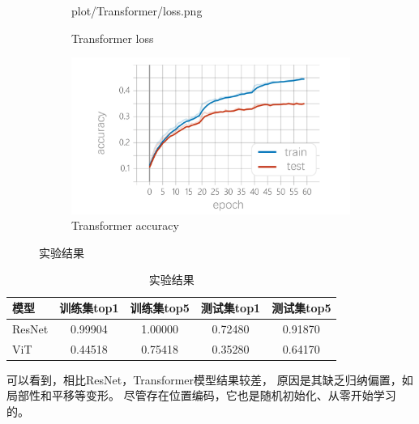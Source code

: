 \documentclass[12pt]{article}
\begin{document}
\begin{figure}[h]
\begin{subfigure}{0.5\textwidth}
		{plot/Transformer/loss.png}
		\caption{Transformer loss}
	\end{subfigure}
	\begin{subfigure}{0.5\textwidth}
		\includegraphics[width=\linewidth]
		{plot/Transformer/top1.png}
		\caption{Transformer accuracy}
	\end{subfigure}
	\caption{实验结果}
	\label{fig:Classify}
\end{figure}

\begin{table}[h]
	\centering
	\begin{tabular}{|l|c|c|c|c|} 
		\hline
		模型 
		& 训练集top1 & 训练集top5 
		& 测试集top1 & 测试集top5\\
		\hline
		ResNet & 0.99904 & 1.00000 & 0.72480 & 0.91870 \\
		ViT & 0.44518 & 0.75418 & 0.35280 & 0.64170 \\
		\hline
	\end{tabular}
	\caption{实验结果}
	\label{tab:Classify}
\end{table}

可以看到，相比ResNet，Transformer模型结果较差，
原因是其缺乏归纳偏置，如局部性和平移等变形。
尽管存在位置编码，它也是随机初始化、从零开始学习的。
	
\end{document}
